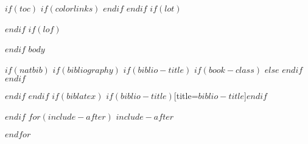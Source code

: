 \documentclass[a4paper,11pt] {report}
\renewcommand{\bibname}{Références}
\begin{document}


$if(toc)$
{
$if(colorlinks)$
\hypersetup{linkcolor=$if(toccolor)$$toccolor$$else$black$endif$}
$endif$
\setcounter{tocdepth}{$toc-depth$}
\tableofcontents
}
$endif$
$if(lot)$
\listoftables
$endif$
$if(lof)$
\listoffigures
$endif$
$body$

\nocite{*}
$if(natbib)$
$if(bibliography)$
$if(biblio-title)$
$if(book-class)$
\renewcommand\bibname{$biblio-title$}
$else$
\renewcommand\refname{$biblio-title$}
$endif$
$endif$
\clearpage
{}



$endif$
$endif$
$if(biblatex)$
\printbibliography$if(biblio-title)$[title=$biblio-title$]$endif$

$endif$
$for(include-after)$
$include-after$

$endfor$
\end{document}
